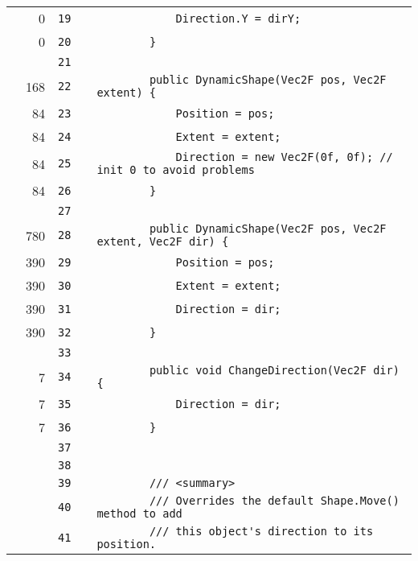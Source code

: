 \documentclass[a4paper,landscape,10pt]{article}
\begin{document}
\begin{longtable}[l]{lrrll}
\cellcolor{red} & 0 & \verb~19~ & & \verb~            Direction.Y = dirY;~\\
\cellcolor{red} & 0 & \verb~20~ & & \verb~        }~\\
\cellcolor{gray} &  & \verb~21~ & & \verb~~\\
\cellcolor{green} & 168 & \verb~22~ & & \verb~        public DynamicShape(Vec2F pos, Vec2F extent) {~\\
\cellcolor{green} & 84 & \verb~23~ & & \verb~            Position = pos;~\\
\cellcolor{green} & 84 & \verb~24~ & & \verb~            Extent = extent;~\\
\cellcolor{green} & 84 & \verb~25~ & & \verb~            Direction = new Vec2F(0f, 0f); // init 0 to avoid problems~\\
\cellcolor{green} & 84 & \verb~26~ & & \verb~        }~\\
\cellcolor{gray} &  & \verb~27~ & & \verb~~\\
\cellcolor{green} & 780 & \verb~28~ & & \verb~        public DynamicShape(Vec2F pos, Vec2F extent, Vec2F dir) {~\\
\cellcolor{green} & 390 & \verb~29~ & & \verb~            Position = pos;~\\
\cellcolor{green} & 390 & \verb~30~ & & \verb~            Extent = extent;~\\
\cellcolor{green} & 390 & \verb~31~ & & \verb~            Direction = dir;~\\
\cellcolor{green} & 390 & \verb~32~ & & \verb~        }~\\
\cellcolor{gray} &  & \verb~33~ & & \verb~~\\
\cellcolor{green} & 7 & \verb~34~ & & \verb~        public void ChangeDirection(Vec2F dir) {~\\
\cellcolor{green} & 7 & \verb~35~ & & \verb~            Direction = dir;~\\
\cellcolor{green} & 7 & \verb~36~ & & \verb~        }~\\
\cellcolor{gray} &  & \verb~37~ & & \verb~~\\
\cellcolor{gray} &  & \verb~38~ & & \verb~~\\
\cellcolor{gray} &  & \verb~39~ & & \verb~        /// <summary>~\\
\cellcolor{gray} &  & \verb~40~ & & \verb~        /// Overrides the default Shape.Move() method to add~\\
\cellcolor{gray} &  & \verb~41~ & & \verb~        /// this object's direction to its position.~\\

\end{longtable}
\end{document}
